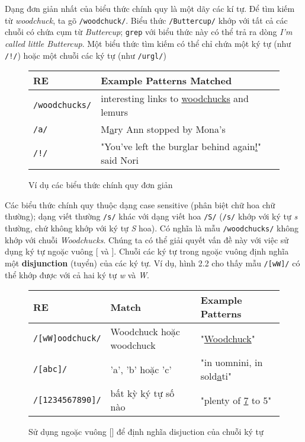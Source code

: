 Dạng đơn giản nhất của biểu thức chính quy là một dãy các kí tự. Để tìm kiếm từ \textit{woodchuck}, ta gõ \verb|/woodchuck/|. Biểu thức \verb|/Buttercup/| khớp với tất cả các chuỗi có chứa cụm từ \textit{Buttercup}; \verb|grep| với biểu thức này có thể trả ra dòng \textit{I'm called little Buttercup}. Một biểu thức tìm kiếm có thể chỉ chứa một ký tự (như \verb|/!/|) hoặc một chuỗi các ký tự (như \verb|/urgl/|)

\begin{figure}[h]
	\begin{tabular}{ l l }
	 \hline
	 RE & Example Patterns Matched \\
	 \hline
	 \verb|/woodchucks/| & interesting links to \underline{woodchucks} and lemurs \\
	 \verb|/a/| & M\underline{a}ry Ann stopped by Mona's  \\
	 \verb|/!/| & "You've left the burglar behind again\underline{!}" said Nori \\
	 \hline
	\end{tabular}
 \caption{Ví dụ các biểu thức chính quy đơn giản}
 \label{table:1}
\end{figure}

Các biểu thức chính quy thuộc dạng case sensitive (phân biệt chữ hoa chữ thường); dạng viết thường \verb|/s/| khác với dạng viết hoa \verb|/S/| (\verb|/s/| khớp với ký tự \textit{s} thường, chứ không khớp với ký tự \textit{S} hoa). Có nghĩa là mẫu \verb|/woodchucks/| không khớp với chuỗi \textit{Woodchucks}. Chúng ta có thể giải quyết vấn đề này với việc sử dụng ký tự ngoặc vuông [ và ]. Chuỗi các ký tự trong ngoặc vuông định nghĩa một \textbf{disjunction} (tuyển) của các ký tự. Ví dụ, hình 2.2 cho thấy mẫu \verb|/[wW]/| có thể khớp được với cả hai ký tự \textit{w} và \textit{W}.

\begin{figure}[h]
	\begin{tabular}{ l l l }
	 \hline
	 RE & Match & Example Patterns \\
	 \hline
	 \verb|/[wW]oodchuck/| & Woodchuck hoặc woodchuck & "\underline{Woodchuck}" \\
	 \verb|/[abc]/| & 'a', 'b' hoặc 'c' & "in uomnini, in sold\underline{a}ti" \\
	 \verb|/[1234567890]/| & bất kỳ ký tự số nào & "plenty of \underline{7} to 5" \\
	 \hline
	\end{tabular}
 \caption{Sử dụng ngoặc vuông [] để định nghĩa disjuction của chuỗi ký tự}
 \label{table:2}
\end{figure}

